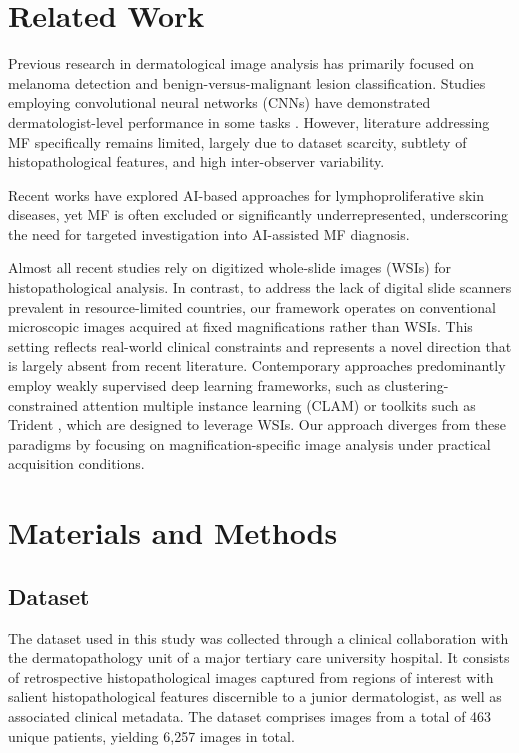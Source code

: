 \documentclass[conference]{IEEEtran}
\begin{document}
\section{Related Work}
Previous research in dermatological image analysis has primarily focused on melanoma detection and benign-versus-malignant lesion classification.
Studies employing convolutional neural networks (CNNs) have demonstrated dermatologist-level performance in some tasks \cite{Doeleman2024-MF}.
However, literature addressing MF specifically remains limited, largely due to dataset scarcity, subtlety  of  histopathological features,
and high inter-observer variability.

Recent works have explored AI-based approaches for lymphoproliferative skin diseases, yet MF is often excluded or significantly underrepresented, underscoring the
need for targeted investigation into AI-assisted MF diagnosis.

Almost all recent studies rely on digitized whole-slide images (WSIs) for histopathological analysis. In contrast, to address the lack of digital slide
scanners prevalent in resource-limited countries, our framework operates on conventional microscopic images acquired at fixed magnifications rather than WSIs.
This setting reflects real-world clinical constraints and represents a novel direction that is largely absent from recent literature.
Contemporary approaches predominantly employ weakly supervised deep learning frameworks, such as clustering-constrained attention multiple instance
learning (CLAM) \cite{Lu2021} or toolkits such as Trident \cite{zhang2025standardizing,vaidya2025molecular}, which are designed to leverage WSIs.
Our approach diverges from these paradigms by focusing on magnification-specific image analysis under practical acquisition conditions.


\section{Materials and Methods}

\subsection{Dataset}
The dataset used in this study was collected through a clinical collaboration with the 
dermatopathology unit of a major tertiary care university hospital.
It consists of retrospective histopathological images captured from regions of interest with 
salient histopathological features discernible to a junior dermatologist, as well as associated clinical metadata. 
The dataset comprises images from a total of 463 unique patients, yielding 6,257 images in total.
\end{document}
